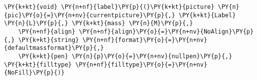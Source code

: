 \begin{Verbatim}[commandchars=\\\{\}]
    \PY{k+kt}{void} \PY{n+nf}{label}\PY{p}{(}\PY{k+kt}{picture} \PY{n}{pic}\PY{o}{=}\PY{n+nv}{currentpicture}\PY{p}{,} \PY{k+kt}{Label} \PY{n}{L}\PY{p}{,} \PY{k+kt}{mass} \PY{n}{M}\PY{p}{,}
    \PY{n+nf}{align} \PY{n+nf}{align}\PY{o}{=}\PY{n+nv}{NoAlign}\PY{p}{,} \PY{k+kt}{string} \PY{n+nf}{format}\PY{o}{=}\PY{n+nv}{defaultmassformat}\PY{p}{,}
    \PY{k+kt}{pen} \PY{n}{p}\PY{o}{=}\PY{n+nv}{nullpen}\PY{p}{,} \PY{k+kt}{filltype} \PY{n+nf}{filltype}\PY{o}{=}\PY{n+nv}{NoFill}\PY{p}{)}
\end{Verbatim}
